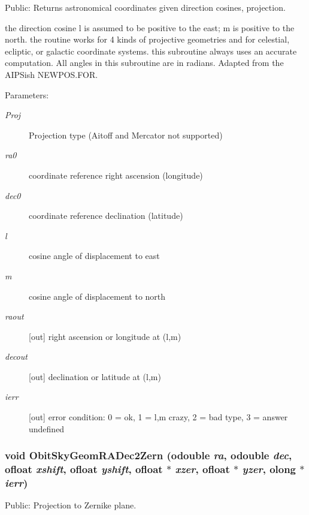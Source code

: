 Public: Returns astronomical coordinates given direction cosines, projection. 

the direction cosine l is assumed to be positive to the east; m is positive to the north. the routine works for 4 kinds of projective geometries and for celestial, ecliptic, or galactic coordinate systems. this subroutine always uses an accurate computation. All angles in this subroutine are in radians. Adapted from the AIPSish NEWPOS.FOR. \begin{Desc}
\item[Parameters:]
\begin{description}
\item[{\em Proj}]Projection type (Aitoff and Mercator not supported) \item[{\em ra0}]coordinate reference right ascension (longitude) \item[{\em dec0}]coordinate reference declination (latitude) \item[{\em l}]cosine angle of displacement to east \item[{\em m}]cosine angle of displacement to north \item[{\em raout}][out] right ascension or longitude at (l,m) \item[{\em decout}][out] declination or latitude at (l,m) \item[{\em ierr}][out] error condition: 0 = ok, 1 = l,m crazy, 2 = bad type, 3 = answer undefined \end{description}
\end{Desc}
\subsubsection{\setlength{\rightskip}{0pt plus 5cm}void Obit\-Sky\-Geom\-RADec2Zern ({\bf odouble} {\em ra}, {\bf odouble} {\em dec}, {\bf ofloat} {\em xshift}, {\bf ofloat} {\em yshift}, {\bf ofloat} $\ast$ {\em xzer}, {\bf ofloat} $\ast$ {\em yzer}, {\bf olong} $\ast$ {\em ierr})}\label{ObitSkyGeom_8c_a20}


Public: Projection to Zernike plane. 

